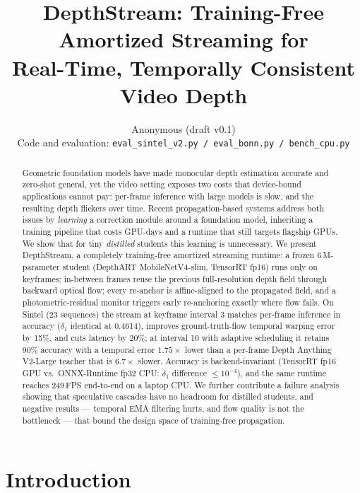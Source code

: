\documentclass[10pt,twocolumn]{article}
\title{\LARGE\bf DepthStream: Training-Free Amortized Streaming for\\ Real-Time, Temporally Consistent Video Depth}
\author{Anonymous (draft v0.1)\\ \small Code and evaluation: \texttt{eval\_sintel\_v2.py / eval\_bonn.py / bench\_cpu.py}}
\date{}
\begin{document}
\sloppy
\maketitle

\begin{abstract}
Geometric foundation models have made monocular depth estimation accurate and
zero-shot general, yet the video setting exposes two costs that device-bound
applications cannot pay: per-frame inference with large models is slow, and the
resulting depth flickers over time. Recent propagation-based systems address
both issues by \emph{learning} a correction module around a foundation model,
inheriting a training pipeline that costs GPU-days and a runtime that still
targets flagship GPUs. We show that for tiny \emph{distilled} students this
learning is unnecessary. We present DepthStream, a completely training-free
amortized streaming runtime: a frozen 6\,M-parameter student
(DepthART MobileNetV4-slim, TensorRT fp16) runs only on keyframes; in-between
frames reuse the previous full-resolution depth field through backward optical
flow; every re-anchor is affine-aligned to the propagated field, and a
photometric-residual monitor triggers early re-anchoring exactly where flow
fails. On Sintel (23 sequences) the stream at keyframe interval 3 matches
per-frame inference in accuracy ($\delta_1$ identical at 0.4614), improves
ground-truth-flow temporal warping error by 15\%, and cuts latency by 20\%;
at interval 10 with adaptive scheduling it retains 90\% accuracy with a
temporal error $1.75\times$ lower than a per-frame Depth Anything V2-Large
teacher that is $6.7\times$ slower. Accuracy is backend-invariant (TensorRT
fp16 GPU vs.\ ONNX-Runtime fp32 CPU: $\delta_1$ difference $\leq 10^{-4}$), and
the same runtime reaches 249\,FPS end-to-end on a laptop CPU. We further
contribute a failure analysis showing that speculative cascades have no
headroom for distilled students, and negative results --- temporal EMA
filtering hurts, and flow quality is not the bottleneck --- that bound the
design space of training-free propagation.
\end{abstract}

\section{Introduction}
\label{sec:intro}
\end{document}
